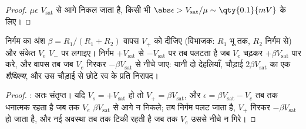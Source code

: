 \begin{proof}
$\mu\epsilon$ $V_{\mathrm{sat}}$ से आगे निकल जाता है, किसी भी $\abs\epsilon >
V_{\mathrm{sat}}/\mu \sim \qty{0.1}{mV}$ के लिए।
\end{proof}

\begin{proposition}[श्मिट ट्रिगर]\label{prop:b1:operational-amplifier:schmitt}
निर्गम का अंश $\beta = R_1/(R_1 + R_2)$ वापस $V_+$ को दीजिए
(विभाजक: $R_1$ भू तक, $R_2$ निर्गम से) और संकेत
$V_e$ $V_-$ पर लगाइए। निर्गम $+V_{\mathrm{sat}}$ से
$-V_{\mathrm{sat}}$ पर तब पलटता है जब $V_e$ चढ़कर $+\beta V_{\mathrm{sat}}$ पार
करे, और वापस तब जब $V_e$ गिरकर $-\beta V_{\mathrm{sat}}$ से नीचे जाए: यानी दो
देहलियाँ, चौड़ाई $2\beta V_{\mathrm{sat}}$ का एक \emph{शैथिल्य}, और उस चौड़ाई
से छोटे रव के प्रति निरापद।
\end{proposition}

\begin{proof}
: अतः संतृप्त। यदि $V_s = +V_{\mathrm{sat}}$ हो तो $V_+ =
\beta V_{\mathrm{sat}}$, और $\epsilon = \beta V_{\mathrm{sat}} - V_e$
तब तक धनात्मक रहता है जब तक $V_e$ $\beta V_{\mathrm{sat}}$ से आगे न निकले; तब
निर्गम पलट जाता है, $V_+$ गिरकर $-\beta V_{\mathrm{sat}}$ हो जाता है, और नई
अवस्था तब तक टिकी रहती है जब तक $V_e$ उससे नीचे न गिरे।
\end{proof}

